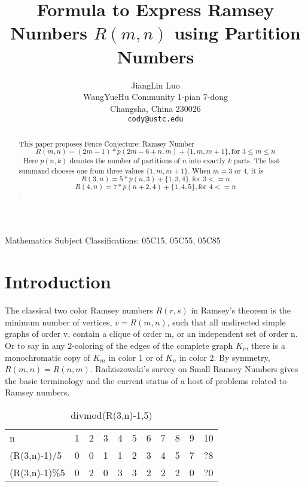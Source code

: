 \documentclass[12pt]{article}
\begin{document}
\title{Formula to Express Ramsey Numbers $R(m,n)$ using Partition Numbers}

\author{
JiangLin Luo \\
\small WangYueHu Community 1-pian 7-dong \\[-0.8ex]
\small Changsha, China 230026 \\
\small\tt cody@ustc.edu \\
}

\maketitle

\begin{center}
\small{Mathematics Subject Classifications: 05C15, 05C55, 05C85}
\end{center}

\begin{abstract}
This paper proposes Fence Conjecture: Ramsey Number 
\[R(m,n)=(2m-1)*p(2m-6+n,m)+\{1,m,m+1\}, \text{for } 3\leq m\leq n\]. 
Here $p(n,k)$ denotes the number of partitions of $n$ into exactly $k$ parts. The last summand chooses one from three values $\{1,m,m+1\}$.
When $m=3 \text{ or }4$, it is 
\[R(3,n)=5*p(n,3)+\{1,3,4\}, \text{for } 3<=n\] 
\[R(4,n)=7*p(n+2,4)+\{1,4,5\}, \text{for } 4<=n\] .
\end{abstract}

\section{Introduction}

The classical two color Ramsey numbers $R(r, s)$ in Ramsey's theorem is the minimum number of vertices, 
$v = R(m, n)$, such that all undirected simple graphs of order v, contain a clique of order m, or an independent set of order n.
Or to say in any $2$-coloring of the edges of the complete graph $K_v$, there
is a monochromatic copy of $K_m$ in color $1$ or of $K_n$ in color $2$.
By symmetry, $R(m, n) = R(n, m)$.
Radziszowski's survey on Small Ramsey Numbers \cite{survey} gives the basic terminology and
the current status of a host of problems related to Ramsey numbers. 

\begin{table}[]
  \caption{divmod(R(3,n)-1,5)}
  \label{tab:divmodR3n1}
  \begin{tabular}{lllllllllll}
  n             & 1 & 2 & 3 & 4 & 5 & 6 & 7 & 8 & 9 & 10 \\
  (R(3,n)-1)/5  & 0 & 0 & 1 & 1 & 2 & 3 & 4 & 5 & 7 & ?8 \\
  (R(3,n)-1)\%5 & 0 & 2 & 0 & 3 & 3 & 2 & 2 & 2 & 0 & ?0
  \end{tabular}
\end{table}
\end{document}
